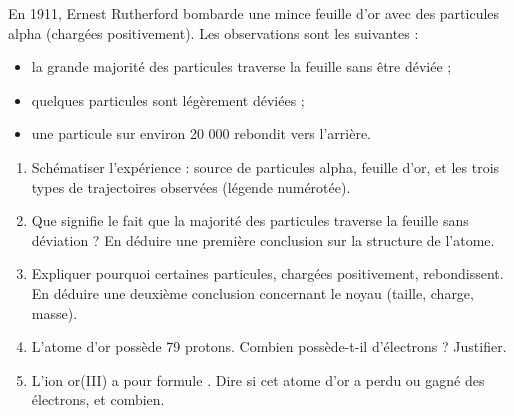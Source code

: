 \documentclass[11pt]{article}
\begin{document}
\begin{exercice}
En 1911, Ernest Rutherford bombarde une mince feuille d'or avec des particules alpha (chargées positivement). Les observations sont les suivantes :
\begin{itemize}
\item la grande majorité des particules traverse la feuille sans être déviée ;
\item quelques particules sont légèrement déviées ;
\item une particule sur environ 20 000 rebondit vers l'arrière.
\end{itemize}
\begin{enumerate}
\item Schématiser l'expérience : source de particules alpha, feuille d'or, et les trois types de trajectoires observées (légende numérotée).
\item Que signifie le fait que la majorité des particules traverse la feuille sans déviation ? En déduire une première conclusion sur la structure de l'atome.
\item Expliquer pourquoi certaines particules, chargées positivement, rebondissent. En déduire une deuxième conclusion concernant le noyau (taille, charge, masse).
\item L'atome d'or possède 79 protons. Combien possède-t-il d'électrons ? Justifier.
\item L'ion or(III) a pour formule . Dire si cet atome d'or a perdu ou gagné des électrons, et combien.
\end{enumerate}
\end{exercice}
\end{document}
